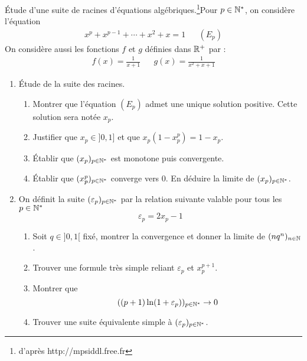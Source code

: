 \'Etude d'une suite de racines d'équations algébriques.\footnote{d'après http://mpsiddl.free.fr}Pour $p\in \mathbb{N}^{*}$, on considère l'équation
\begin{align*}
x^p + x^{p-1} + \cdots + x^2 +x =1 & &(E_p)
\end{align*}
On considère aussi les fonctions $f$ et $g$ définies dans $\mathbb{R}^+$ par :
\begin{align*}
 f(x) = \frac{1}{x+1}  & &
 g(x) = \frac{1}{x^2+x+1} 
\end{align*}

\begin{enumerate}
 \item \'Etude de la suite des racines.
   \begin{enumerate}
     \item Montrer que l'équation $(E_p)$ admet une unique solution positive. Cette solution sera notée $x_p$.
     \item Justifier que $x_p\in ]0,1]$ et que $x_p(1-x_p^p)=1-x_p$.
     \item \'Etablir que $ (x_p)_{p\in\mathbb{N}^*}$ est monotone puis convergente. 
     \item \'Etablir que $(x_p^p)_{p\in\mathbb{N}^*}$ converge vers 0. En déduire la limite de $ (x_p)_{p\in\mathbb{N}^*}$.
   \end{enumerate}
  \item On définit la suite $ (\varepsilon_p)_{p\in\mathbb{N}^*}$ par la relation suivante valable pour tous les $p\in \mathbb{N}^*$
\begin{displaymath}
 \varepsilon_p = 2x_p - 1
\end{displaymath}
   \begin{enumerate}
\item Soit $q\in]0,1[$ fixé, montrer la convergence et donner la limite de $(nq^n)_{n\in\mathbb{N}}$.
 \item Trouver une formule très simple reliant  $\varepsilon_p$ et $x_p^{p+1}$.
\item Montrer que
\begin{displaymath}
 ((p+1)\ln(1+\varepsilon_p))_{p\in\mathbb{N}^*} \rightarrow 0
\end{displaymath}
  \item Trouver une suite équivalente simple à $ (\varepsilon_p)_{p\in\mathbb{N}^*}$.
\end{enumerate}


\end{enumerate}
